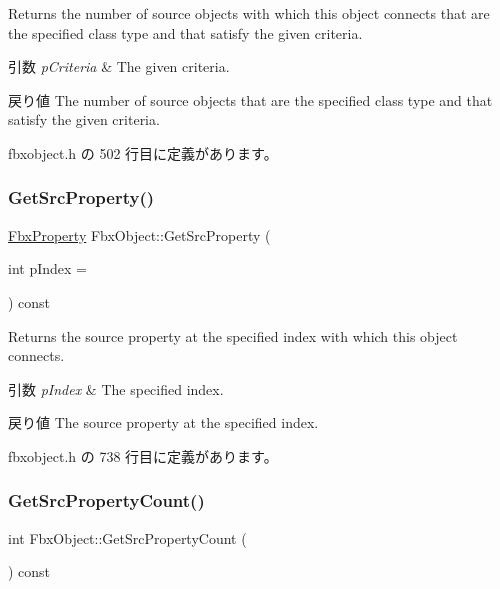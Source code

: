 Returns the number of source objects with which this object connects that are the specified class type and that satisfy the given criteria. 
\begin{DoxyParams}{引数}
{\em p\+Criteria} & The given criteria. \\
\hline
\end{DoxyParams}
\begin{DoxyReturn}{戻り値}
The number of source objects that are the specified class type and that satisfy the given criteria. 
\end{DoxyReturn}


 fbxobject.\+h の 502 行目に定義があります。

\mbox{\label{class_fbx_object_aa79380869a619b260fd1f861eb224f5e}} 
\subsubsection{\texorpdfstring{Get\+Src\+Property()}{GetSrcProperty()}}
{\footnotesize\ttfamily \hyperlink{class_fbx_property}{Fbx\+Property} Fbx\+Object\+::\+Get\+Src\+Property (\begin{DoxyParamCaption}\item[{int}]{p\+Index = {} }\end{DoxyParamCaption}) const\hspace{0.3cm}{\ttfamily [inline]}}

Returns the source property at the specified index with which this object connects. 
\begin{DoxyParams}{引数}
{\em p\+Index} & The specified index. \\
\hline
\end{DoxyParams}
\begin{DoxyReturn}{戻り値}
The source property at the specified index. 
\end{DoxyReturn}


 fbxobject.\+h の 738 行目に定義があります。

\mbox{\label{class_fbx_object_a0c9680063d0f6771dd881cf3950337d6}} 
\subsubsection{\texorpdfstring{Get\+Src\+Property\+Count()}{GetSrcPropertyCount()}}
{\footnotesize\ttfamily int Fbx\+Object\+::\+Get\+Src\+Property\+Count (\begin{DoxyParamCaption}{ }\end{DoxyParamCaption}) const\hspace{0.3cm}{\ttfamily [inline]}}

